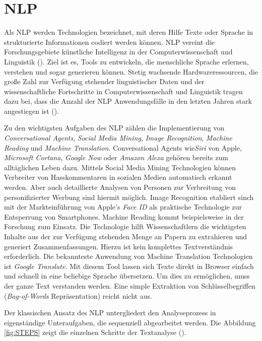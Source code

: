 \section{NLP}

Als \ac{NLP} werden Technologien bezeichnet, mit deren Hilfe Texte oder Sprache in strukturierte Informationen codiert werden können. \ac{NLP} vereint die Forschungsgebiete künstliche Intelligenz in der Computerwissenschaft und Linguistik (\cite[vgl.][1]{ITWISSEN}). Ziel ist es, Tools zu entwickeln, die menschliche Sprache erlernen, verstehen und sogar generieren können. Stetig wachsende Hardwareressourcen, die große Zahl zur Verfügung stehender linguistischer Daten und der wissenschaftliche Fortschritte in Computerwissenschaft und Linguistik tragen dazu bei, dass die Anzahl der \ac{NLP} Anwendungsfälle in den letzten Jahren stark angestiegen ist (\cite[vgl.][1]{HIRSCHBERG}). 
\par
Zu den wichtigsten Aufgaben des \ac{NLP} zählen die Implementierung von \textit{Conversational Agents}, \textit{Social Media Mining}, \textit{Image Recognition}, \textit{Machine Reading} und \textit{Machine Translation}. Conversational Agents wie\textit{Siri} von Apple, \textit{Microsoft Cortana}, \textit{Google Now} oder \textit{Amazon Alexa} gehören bereits zum alltäglichen Leben dazu. Mittels Social Media Mining Technologien können Verbreiter von Hasskommentaren in sozialen Medien automatisch erkannt werden. Aber auch detaillierte Analysen von Personen zur Verbreitung von personifizierter Werbung sind hiermit möglich. Image Recognition etabliert sinch mit der Markteinführung von Apple's \textit{Face ID} als praktische Technologie zur Entsperrung von Smartphones. Machine Reading kommt beispielsweise in der Forschung zum Einsatz. Die Technologie hilft Wissenschaftlern die wichtigsten Inhalte aus der zur Verfügung stehenden Menge an Papern zu extrahieren und generiert Zusammenfassungen. Hierzu ist kein komplettes Textverständnis erforderlich. Die bekannteste Anwendung  von Machine Translation Technologien ist \textit{Google Translate}. Mit diesem Tool lassen sich Texte direkt in Browser einfach und schnell in eine beliebige Sprache übersetzen. Um dies zu ermöglichen, muss der ganze Text verstanden werden. Eine simple Extraktion von Schlüsselbegriffen (\textit{Bag-of-Words} Repräsentation) reicht nicht aus.
\par
Der klassischen Ansatz des \ac{NLP} untergliedert den Analyseprozess in eigenständige Unteraufgaben, die sequenziell abgearbeitet werden. Die Abbildung \ref{fig:STEPS} zeigt die einzelnen Schritte der Textanalyse (\cite[vgl.][4]{DALE}). 
